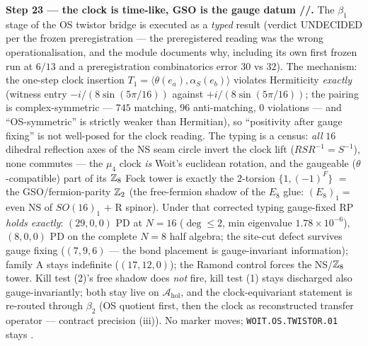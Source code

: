 \par\smallskip\noindent\textbf{Step 23 --- the clock is time-like, GSO is the gauge datum
\mE/\mC/\mO.} The $\beta_1$ stage of the OS twistor bridge is executed as a \emph{typed} result
(verdict UNDECIDED per the frozen preregistration --- the preregistered reading was the wrong
operationalisation, and the module documents why, including its own first frozen run at $6/13$
and a preregistration combinatorics error $30$ vs $32$). The mechanism: the one-step clock
insertion $T_1=\langle\theta(e_a),\alpha_S(e_b)\rangle$ violates Hermiticity \emph{exactly}
(witness entry $-i/(8\sin(5\pi/16))$ against $+i/(8\sin(5\pi/16))$; the pairing is
complex-symmetric --- $745$ matching, $96$ anti-matching, $0$ violations --- and
``OS-symmetric'' is strictly weaker than Hermitian), so ``positivity after gauge fixing'' is
not well-posed for the clock reading. The typing is a census: \emph{all} $16$ dihedral
reflection axes of the NS seam circle invert the clock lift ($RSR^{-1}=S^{-1}$), none commutes
--- the $\mu_4$ clock \emph{is} Woit's euclidean rotation, and the gaugeable
($\theta$-compatible) part of its $\mathbb{Z}_8$ Fock tower is exactly the $2$-torsion
$\{1,(-1)^F\}$ $=$ the GSO/fermion-parity $\mathbb{Z}_2$ (the free-fermion shadow of the $E_8$ glue:
$(E_8)_1=$ even NS of $SO(16)_1$ $+$ R spinor). Under that corrected typing gauge-fixed RP
\emph{holds exactly}: $(29,0,0)$ PD at $N=16$ ($\deg\le2$, min eigenvalue $1.78\times10^{-6}$),
$(8,0,0)$ PD on the complete $N=8$ half algebra; the site-cut defect survives gauge fixing
($(7,9,6)$ --- the bond placement is gauge-invariant information); family A stays indefinite
($(17,12,0)$); the Ramond control forces the NS/$\mathbb{Z}_8$ tower. Kill test (2)'s free shadow does
\emph{not} fire, kill test (1) stays discharged also gauge-invariantly; both stay live on
$\mathcal A_{\mathrm{hol}}$, and the clock-equivariant statement is re-routed through $\beta_2$
(OS quotient first, then the clock as reconstructed transfer operator --- contract precision
(iii)). No marker moves; \texttt{WOIT.OS.TWISTOR.01} stays \mO.

